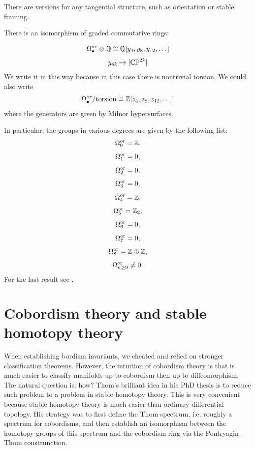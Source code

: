 There are versions for any tangential structure, such as orientation or stable framing.

\begin{thm}
    There is an isomorphism of \Z graded commutative rings:
    
    \begin{equation*}
        \Omega_\bullet^{or} \otimes \mathbb{Q} \cong \mathbb{Q}[y_4, y_8, y_{12}, \dots]
    \end{equation*}
     $$  y_{4k}\mapsto [\mathbb{C}\mathbb{P}^{2k}]$$
     We write it in this way because in this case there is nontrivial torsion. We could also write
       $$ \Omega_\bullet^{or} /\text{torsion} \cong \mathbb{Z}[z_4, z_8, z_{12}, \dots]$$
    where the generators are given by Milnor hypersurfaces.
\end{thm}
\begin{ex}
In particular, the groups in various degrees are given by the following list:
$$ \Omega_{0}^{\operatorname{or}}=\mathbb{Z},$$
$$ \Omega_{1}^{\operatorname{or}}=0,$$
$$ \Omega_{2}^{\operatorname{or}}=0,$$
$$ \Omega_{3}^{\operatorname{or}}=0,$$
$$ \Omega_{4}^{\operatorname{or}}=\mathbb{Z},$$
$$ \Omega_{5}^{\operatorname{or}}=\mathbb{Z}_2,$$
$$ \Omega_{6}^{\operatorname{or}}=0,$$
$$ \Omega_{7}^{\operatorname{or}}=0,$$
$$ \Omega_{8}^{\operatorname{or}}=\mathbb{Z}\oplus\mathbb{Z},$$
$$ \Omega_{n\geq 9}^{\operatorname{or}}\neq 0.$$
For the last result see \cite[p. 203]{MilnorS05}.
\end{ex}
\section{Cobordism theory and stable homotopy theory \extra}
When establishing bordism invariants, we cheated and relied on stronger classification theorems.
However, the intuition of cobordism theory is that is much easier to classify manifolds up to cobordism
then up to diffeomorphism.
The natural question is: how? Thom's brilliant idea in his PhD thesis is to reduce such problem to 
a problem in stable homotopy theory. This is very convenient because stable homotopy theory is much
easier than ordinary differential topology. His strategy was to first define the Thom spectrum, i.e.
roughly a spectrum for cobordisms, and then establish an isomorphism between the homotopy groups
 of this spectrum and the cobordism ring via the Pontryagin-Thom construnction.
 
